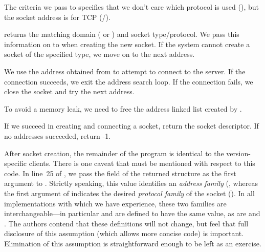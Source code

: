 \begin{topcode}


The criteria we pass to 
specifies that we don't care which protocol is used
(), but the socket address is for TCP 
(/).  


\begin{bottomcode}


 returns the matching domain (
or ) and socket type/protocol.  We pass this
information on to  when creating the new socket.
If the system cannot create a socket of the specified type, we move on
to the next address.


We use the address obtained from  to attempt to 
connect to the server.  If the connection succeeds, we exit the address
search loop.  If the connection fails, we close the socket and
try the next address.

\end{bottomcode}


To avoid a memory leak, we need to free the address linked list created by
.


If we succeed in creating and connecting a socket, return the socket descriptor.
If no addresses succeeded, return -1.

\end{topcode}


After socket creation, the remainder of the program is identical to the 
version-specific clients.
There is one caveat that must be mentioned with respect to this code.
In line~25 of , we pass the 
 field of the returned  structure 
as the first  argument to .
Strictly speaking, this value identifies an
\emph{address family} (,
whereas the first argument of 
indicates the desired \emph{protocol family\/} of the socket
().
In all implementations with which we have experience, these two
families are interchangeable---in particular 
and  are defined to have the same value, as are
 and .
%
%
The authors contend that these definitions will not change, but
\label{page:AFPFassumpt}
feel that full disclosure of this assumption (which allows more
concise code) is important.
Elimination of this assumption is straightforward enough to be left as
an exercise.

